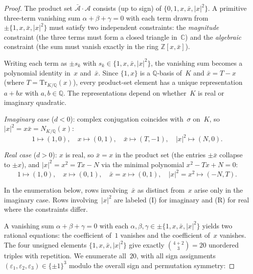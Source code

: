 \documentclass[12pt,a4paper]{article}
\newcommand{\C}{\mathbb{C}}
\newcommand{\Z}{\mathbb{Z}}
\newcommand{\Q}{\mathbb{Q}}
\newcommand{\Norm}[1]{N_{K/\Q}\!\left(#1\right)}
\newcommand{\Tr}[1]{\mathrm{Tr}_{K/\Q}\!\left(#1\right)}
\begin{document}
\begin{proof}
The product set $\bar{\mathcal{A}} \cdot \mathcal{A}$ consists (up to
sign) of $\{0, 1, x, \bar{x}, |x|^2\}$.  A primitive three-term
vanishing sum $\alpha + \beta + \gamma = 0$ with each term drawn
from $\pm\{1, x, \bar{x}, |x|^2\}$ must satisfy two independent
constraints: the \emph{magnitude} constraint (the three terms must
form a closed triangle in~$\C$) and the \emph{algebraic} constraint
(the sum must vanish exactly in the ring $\Z[x, \bar{x}]$).

Writing each term as $\pm s_k$ with $s_k \in \{1, x, \bar{x},
|x|^2\}$, the vanishing sum becomes a polynomial identity in~$x$
and~$\bar{x}$.  Since $\{1, x\}$ is a $\Q$-basis of~$K$ and
$\bar{x} = T - x$ (where $T = \Tr{x}$), every product-set element
has a unique representation $a + bx$ with $a, b \in \Q$.  The
representations depend on whether~$K$ is real or imaginary quadratic.

\smallskip
\noindent\emph{Imaginary case} ($d < 0$): complex conjugation
coincides with~$\sigma$ on~$K$, so $|x|^2 = x\bar{x} = \Norm{x}$:
\[
  1 \mapsto (1, 0),\quad x \mapsto (0, 1),\quad
  \bar{x} \mapsto (T, -1),\quad |x|^2 \mapsto (N, 0).
\]

\noindent\emph{Real case} ($d > 0$): $x$ is real, so $\bar{x} = x$
in the product set (the entries $\pm\bar{x}$ collapse to $\pm x$),
and $|x|^2 = x^2 = Tx - N$ via the minimal polynomial
$x^2 - Tx + N = 0$:
\[
  1 \mapsto (1, 0),\quad x \mapsto (0, 1),\quad
  \bar{x} = x \mapsto (0, 1),\quad |x|^2 = x^2 \mapsto (-N, T).
\]

\noindent In the enumeration below, rows involving~$\bar{x}$ as
distinct from~$x$ arise only in the imaginary case.  Rows
involving~$|x|^2$ are labeled (I) for imaginary and (R) for real
where the constraints differ.

A vanishing sum $\alpha + \beta + \gamma = 0$ with each
$\alpha, \beta, \gamma \in \pm\{1, x, \bar{x}, |x|^2\}$ yields
two rational equations: the coefficient of~$1$ vanishes and the
coefficient of~$x$ vanishes.  The four unsigned elements
$\{1, x, \bar{x}, |x|^2\}$ give exactly $\binom{4+2}{3} = 20$
unordered triples with repetition.  We enumerate all~$20$, with all
sign assignments $(\varepsilon_1, \varepsilon_2,
\varepsilon_3) \in \{\pm 1\}^3$ modulo the overall sign and
permutation symmetry:


\end{proof}
\end{document}

